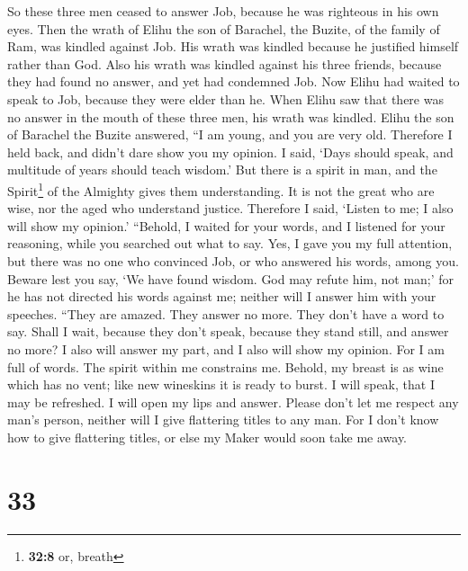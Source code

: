  So these three men ceased to answer Job, because he was
righteous in his own eyes.  Then the wrath of Elihu the
son of Barachel, the Buzite, of the family of Ram, was kindled against
Job. His wrath was kindled because he justified himself rather than God.
 Also his wrath was kindled against his three friends,
because they had found no answer, and yet had condemned Job.
 Now Elihu had waited to speak to Job, because they were
elder than he.  When Elihu saw that there was no answer in
the mouth of these three men, his wrath was kindled. 
Elihu the son of Barachel the Buzite answered, ``I am young, and you are
very old. Therefore I held back, and didn't dare show you my opinion.
 I said, `Days should speak, and multitude of years should
teach wisdom.'  But there is a spirit in man, and the
Spirit\footnote{\textbf{32:8} or, breath} of the Almighty gives them
understanding.  It is not the great who are wise, nor the
aged who understand justice.  Therefore I said, `Listen
to me; I also will show my opinion.'  ``Behold, I waited
for your words, and I listened for your reasoning, while you searched
out what to say.  Yes, I gave you my full attention, but
there was no one who convinced Job, or who answered his words, among
you.  Beware lest you say, `We have found wisdom. God may
refute him, not man;'  for he has not directed his words
against me; neither will I answer him with your speeches.
 ``They are amazed. They answer no more. They don't have
a word to say.  Shall I wait, because they don't speak,
because they stand still, and answer no more?  I also
will answer my part, and I also will show my opinion. 
For I am full of words. The spirit within me constrains me.
 Behold, my breast is as wine which has no vent; like new
wineskins it is ready to burst.  I will speak, that I may
be refreshed. I will open my lips and answer.  Please
don't let me respect any man's person, neither will I give flattering
titles to any man.  For I don't know how to give
flattering titles, or else my Maker would soon take me away.

\hypertarget{section-23}{%
\section{33}\label{section-23}}


